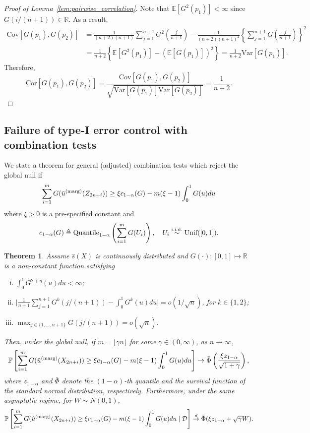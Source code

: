 \documentclass[11pt]{article}
\newtheorem{thm}{Theorem}
\newcommand{\Unif}{\textnormal{Unif}}
\def\R{\mathbb{R}}
\def\E{\mathbb{E}}
\def\marg{\textnormal{(marg)}}
\renewcommand{\P}{\mathbb{P}}
\begin{document}
\begin{proof}[Proof of Lemma~\ref{lem:pairwise_correlation}]
Note that $\E[G^2(p_1)] < \infty$ since $G(i / (n + 1))\in \mathbb{R}$. As a result,
\begin{align*}
  \mathrm{Cov}\left[ G(p_1), G(p_2) \right] 
  &= \frac{1}{(n+2)(n+1)}\sum_{j=1}^{n+1}G^2\left(\frac{j}{n+1}\right) - \frac{1}{(n+2)(n+1)^2}\left\{\sum_{j=1}^{n+1}G\left(\frac{j}{n+1}\right)\right\}^2\\
  & = \frac{1}{n+2}\left\{\E[G^2(p_1)] - (\E[G(p_1)])^2\right\} = \frac{1}{n+2}\mathrm{Var}[G(p_1)].
\end{align*}
Therefore, 
\[\mathrm{Cor}\left[ G(p_1), G(p_2) \right] = \frac{\mathrm{Cov}\left[ G(p_1), G(p_2) \right]}{\sqrt{\mathrm{Var}[G(p_1)]\mathrm{Var}[G(p_2)]}} = \frac{1}{n + 2}.\]
\end{proof}

\subsection{Failure of type-I error control with combination tests} \label{app:global_testing}
We state a theorem for general (adjusted) combination tests which reject the global null if $$
\sum_{i=1}^{m}G(\hat{u}^\marg(Z_{2n+i}))\ge \xi c_{1-\alpha}(G) - m(\xi - 1)\int_0^1 G(u)du
$$
where $\xi > 0$ is a pre-specified constant and 
$$c_{1-\alpha}(G)\triangleq \textnormal{Quantile}_{1 - \alpha}\left(\sum_{i=1}^{m}G(U_i)\right), \quad U_i\stackrel{\mathrm{i.i.d.}}{\sim}\Unif([0, 1]).
$$

\begin{thm}\label{thm:combination_test}
Assume $\hat{s}(X)$ is continuously distributed and $G(\cdot): [0, 1]\mapsto \R$ is a non-constant function satisfying
\begin{enumerate}[(i)]
    \item $\int_{0}^{1}G^{2 + \eta}(u)du < \infty$;
    \item $\big|\frac{1}{n+1}\sum_{j=1}^{n+1}G^k\left(j / (n + 1)\right) - \int_{0}^{1}G^{k}(u)du\big| = o(1 / \sqrt{n})$, for $k \in \{1, 2\}$;
    \item $\max_{j\in \{1, \ldots, n + 1\}}G(j / (n + 1)) = o(\sqrt{n})$.
\end{enumerate}
Then, under the global null, if $m = \lfloor\gamma n\rfloor$ for some $\gamma \in (0, \infty)$, as $n \to \infty$, 
\begin{equation}\label{eq:unconditional_typeI}
\P\left[\sum_{i=1}^{m} G(\hat{u}^\marg(X_{2n+i}))\ge \xi c_{1 - \alpha}(G) - m(\xi - 1)\int_0^1 G(u)du\right]\rightarrow \bar{\Phi}\left(\frac{\xi z_{1 - \alpha}}{\sqrt{1 + \gamma}}\right),
\end{equation}
where $z_{1 - \alpha}$ and $\bar{\Phi}$ denote the $(1 - \alpha)$-th quantile and the survival function of the standard normal distribution, respectively. Furthermore, under the same asymptotic regime, for $W\sim N(0, 1)$,
\begin{equation}\label{eq:conditional_typeI-app}
\P\left[\sum_{i=1}^{m}G(\hat{u}^\marg(X_{2n+i}))\ge \xi c_{1 - \alpha}(G) - m(\xi - 1)\int_0^1 G(u)du\mid \mathcal{D} \right]\stackrel{d}{\rightarrow} \bar{\Phi}(\xi z_{1 - \alpha} + \sqrt{\gamma} W).
\end{equation}
\end{thm}
\end{document}
